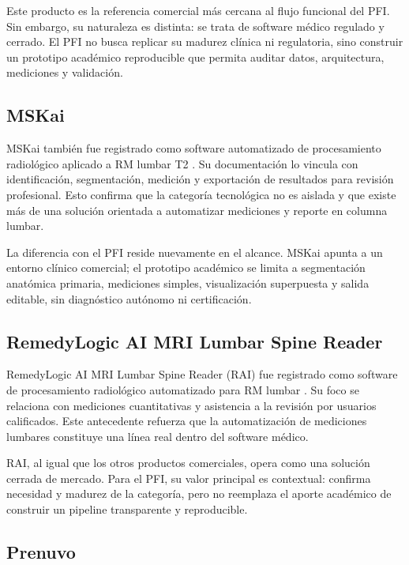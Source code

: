 Este producto es la referencia comercial más cercana al flujo funcional del PFI. Sin embargo, su naturaleza es distinta: se trata de software médico regulado y cerrado. El PFI no busca replicar su madurez clínica ni regulatoria, sino construir un prototipo académico reproducible que permita auditar datos, arquitectura, mediciones y validación.

\subsection{MSKai}

MSKai también fue registrado como software automatizado de procesamiento radiológico aplicado a RM lumbar T2 \parencite{fda_mskai_2024}. Su documentación lo vincula con identificación, segmentación, medición y exportación de resultados para revisión profesional. Esto confirma que la categoría tecnológica no es aislada y que existe más de una solución orientada a automatizar mediciones y reporte en columna lumbar.

La diferencia con el PFI reside nuevamente en el alcance. MSKai apunta a un entorno clínico comercial; el prototipo académico se limita a segmentación anatómica primaria, mediciones simples, visualización superpuesta y salida editable, sin diagnóstico autónomo ni certificación.

\subsection{RemedyLogic AI MRI Lumbar Spine Reader}

RemedyLogic AI MRI Lumbar Spine Reader (RAI) fue registrado como software de procesamiento radiológico automatizado para RM lumbar \parencite{fda_remedylogic_2024}. Su foco se relaciona con mediciones cuantitativas y asistencia a la revisión por usuarios calificados. Este antecedente refuerza que la automatización de mediciones lumbares constituye una línea real dentro del software médico.

RAI, al igual que los otros productos comerciales, opera como una solución cerrada de mercado. Para el PFI, su valor principal es contextual: confirma necesidad y madurez de la categoría, pero no reemplaza el aporte académico de construir un pipeline transparente y reproducible.


\subsection{Prenuvo}

